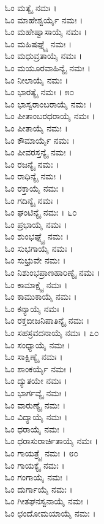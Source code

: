 \begin{multicols}{2}
ಓಂ ಮತ್ಯೈ ನಮಃ ।\\
ಓಂ ಮಾಹೇಶ್ವರ್ಯೈ ನಮಃ ।\\
ಓಂ ಮಹೇಷ್ವಾಸಾಯೈ ನಮಃ ।\\
ಓಂ ಮಹಿಷಘ್ನ್ಯೈ ನಮಃ ।\\
ಓಂ ಮಧುವ್ರತಾಯೈ ನಮಃ ।\\
ಓಂ ಮಯೂರವಾಹಿನ್ಯೈ ನಮಃ ।\\
ಓಂ ನೀಲಾಯೈ ನಮಃ ।\\
ಓಂ ಭಾರತ್ಯೈ ನಮಃ । ೫೦\\
ಓಂ ಭಾಸ್ವರಾಂಬರಾಯೈ ನಮಃ ।\\
ಓಂ ಪೀತಾಂಬರಧರಾಯೈ ನಮಃ ।\\
ಓಂ ಪೀತಾಯೈ ನಮಃ ।\\
ಓಂ ಕೌಮಾರ್ಯೈ ನಮಃ ।\\
ಓಂ ಪೀವರಸ್ತನ್ಯೈ ನಮಃ ।\\
ಓಂ ರಜನ್ಯೈ ನಮಃ ।\\
ಓಂ ರಾಧಿನ್ಯೈ ನಮಃ ।\\
ಓಂ ರಕ್ತಾಯೈ ನಮಃ ।\\
ಓಂ ಗದಿನ್ಯೈ ನಮಃ ।\\
ಓಂ ಘಂಟಿನ್ಯೈ ನಮಃ । ೬೦\\
ಓಂ ಪ್ರಭಾಯೈ ನಮಃ ।\\
ಓಂ ಶುಂಭಘ್ನ್ಯೈ ನಮಃ ।\\
ಓಂ ಸುಭಗಾಯೈ ನಮಃ ।\\
ಓಂ ಸುಭ್ರುವೇ ನಮಃ ।\\
ಓಂ ನಿಶುಂಭಪ್ರಾಣಹಾರಿಣ್ಯೈ ನಮಃ ।\\
ಓಂ ಕಾಮಾಕ್ಷ್ಯೈ ನಮಃ ।\\
ಓಂ ಕಾಮುಕಾಯೈ ನಮಃ ।\\
ಓಂ ಕನ್ಯಾಯೈ ನಮಃ ।\\
ಓಂ ರಕ್ತಬೀಜನಿಪಾತಿನ್ಯೈ ನಮಃ ।\\
ಓಂ ಸಹಸ್ರವದನಾಯೈ ನಮಃ । ೭೦\\
ಓಂ ಸಂಧ್ಯಾಯೈ ನಮಃ ।\\
ಓಂ ಸಾಕ್ಷಿಣ್ಯೈ ನಮಃ ।\\
ಓಂ ಶಾಂಕರ್ಯೈ ನಮಃ ।\\
ಓಂ ದ್ಯುತಯೇ ನಮಃ ।\\
ಓಂ ಭಾರ್ಗವ್ಯೈ ನಮಃ ।\\
ಓಂ ವಾರುಣ್ಯೈ ನಮಃ ।\\
ಓಂ ವಿದ್ಯಾಯೈ ನಮಃ ।\\
ಓಂ ಧರಾಯೈ ನಮಃ ।\\
ಓಂ ಧರಾಸುರಾರ್ಚಿತಾಯೈ ನಮಃ ।\\
ಓಂ ಗಾಯತ್ರ್ಯೈ ನಮಃ । ೮೦\\
ಓಂ ಗಾಯಕ್ಯೈ ನಮಃ ।\\
ಓಂ ಗಂಗಾಯೈ ನಮಃ ।\\
ಓಂ ದುರ್ಗಾಯೈ ನಮಃ ।\\
ಓಂ ಗೀತಘನಸ್ವನಾಯೈ ನಮಃ ।\\
ಓಂ ಛಂದೋಮಯಾಯೈ ನಮಃ ।\\

\end{multicols}
